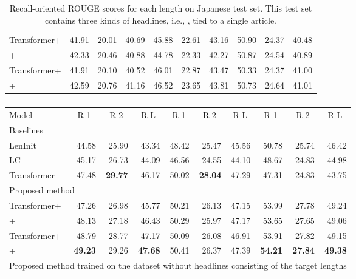 \documentclass[11pt,a4paper]{article}
\begin{document}
\begin{table*}[!t]
\begin{tabular}{| l | r r r | r r r | r r r |}
  Transformer+ & 41.91 & 20.01 & 40.69 & 45.88 & 22.61 & 43.16 & 50.90 & 24.37 & 40.48 \\
  + & 42.33 & 20.46 & 40.88 & 44.78 & 22.33 & 42.27 & 50.87 & 24.54 & 40.89 \\
  Transformer+ & 41.91 & 20.10 & 40.52 & 46.01 & 22.87 & 43.47 & 50.33 & 24.37 & 41.00 \\
  + & 42.59 & 20.76 & 41.16 & 46.52 & 23.65 & 43.81 & 50.73 & 24.64 & 41.01 \\ \hline
  \end{tabular}
  \caption{Recall-oriented ROUGE scores for each length on Japanese test set. This test set contains three kinds of headlines, i.e., , tied to a single article.\label{tab:jamul_result}}
\end{table*}


\begin{table*}[!t]
  \centering
  \footnotesize
  \begin{tabular}{| l | r r r | r r r | r r r |} \hline
  & \multicolumn{3}{|c|}{} & \multicolumn{3}{c|}{} & \multicolumn{3}{c|}{} \\ \hline
  Model & \multicolumn{1}{c}{R-1} & \multicolumn{1}{c}{R-2} & \multicolumn{1}{c|}{R-L} & \multicolumn{1}{c}{R-1} & \multicolumn{1}{c}{R-2} & \multicolumn{1}{c|}{R-L} & \multicolumn{1}{c}{R-1} & \multicolumn{1}{c}{R-2} & \multicolumn{1}{c|}{R-L} \\ \hline
  \multicolumn{10}{|l|}{Baselines} \\ \hline
  LenInit& 44.58 & 25.90 & 43.34 & 48.42 & 25.47 & 45.56 & 50.78 & 25.74 & 46.42 \\
  LC & 45.17 & 26.73 & 44.09 & 46.56 & 24.55 & 44.10 & 48.67 & 24.83 & 44.98 \\
  Transformer & 47.48 & {\bf 29.77} & 46.17 & 50.02 & {\bf 28.04} & 47.29 & 47.31 & 24.83 & 43.75 \\ \hline
  \multicolumn{10}{|l|}{Proposed method} \\ \hline
  Transformer+ & 47.26 & 26.98 & 45.77 & 50.21 & 26.13 & 47.15 & 53.99 & 27.78 & 49.24 \\
  + & 48.13 & 27.18 & 46.43 & 50.29 & 25.97 & 47.17 & 53.65 & 27.65 & 49.06 \\
  Transformer+ & 48.79 & 28.77 & 47.17 & 50.09 & 26.08 & 46.91 & 53.91 & 27.82 & 49.15 \\
  + & {\bf 49.23} & 29.26 & {\bf 47.68} & 50.41 & 26.37 & 47.39 & {\bf 54.21} & {\bf 27.84} & {\bf 49.38} \\ \hline
  \multicolumn{10}{|l|}{Proposed method trained on the dataset without headlines consisting of the target lengths} \\ \hline

\end{tabular}
\end{table*}
\end{document}
